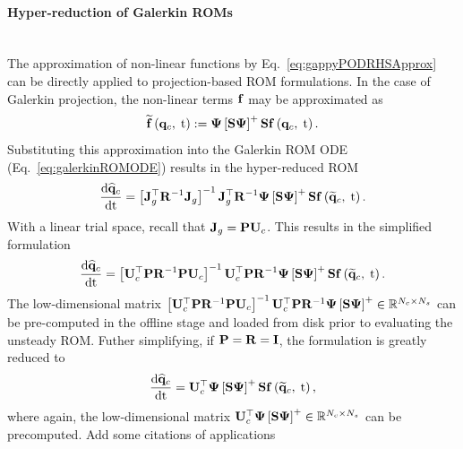 \paragraph*{Hyper-reduction of Galerkin ROMs}\mbox{}\\
%
The approximation of non-linear functions by Eq.~\ref{eq:gappyPODRHSApprox} can be directly applied to projection-based ROM formulations. In the case of Galerkin projection, the non-linear terms $\mathbf{f}$ may be approximated as
%
\begin{equation}
	\rhsApproxFunc{\consVec, \; \timeVar} \defEq \deimBasis \left[ \sampMat \deimBasis \right]^+ \sampMat \rhsFunc{\consVec, \; \timeVar}.
\end{equation}
%
Substituting this approximation into the Galerkin ROM ODE (Eq.~\ref{eq:galerkinROMODE}) results in the hyper-reduced ROM
%
\begin{equation}\label{eq:galerkinROMHR}
    \ode{\consVecCoef}{\timeVar} = \left[\jacobDecode^\top \resScaleInv \jacobDecode\right]^{-1} \jacobDecode^\top \resScaleInv \deimBasis \left[ \sampMat \deimBasis \right]^+ \sampMat \rhsFunc{\consVecRom, \; \timeVar}.
\end{equation}
%
With a linear trial space, recall that $\jacobDecode = \consScale \consTrial$. This results in the simplified formulation
%
\begin{equation}
    \ode{\consVecCoef}{\timeVar} = \left[\consTrial^\top \consScale \resScaleInv \consScale \consTrial\right]^{-1} \consTrial^\top \consScale \resScaleInv \deimBasis \left[ \sampMat \deimBasis \right]^+ \sampMat \rhsFunc{\consVecRom, \; \timeVar}.
\end{equation}
%
The low-dimensional matrix $\left[\consTrial^\top \consScale \resScaleInv \consScale \consTrial\right]^{-1} \consTrial^\top \consScale \resScaleInv \deimBasis \left[ \sampMat \deimBasis \right]^+ \inRTwo{\numConsModes}{\numSamps}$ can be pre-computed in the offline stage and loaded from disk prior to evaluating the unsteady ROM. Futher simplifying, if $\consScale = \resScale = \identMat$, the formulation is greatly reduced to
%
\begin{equation}
    \ode{\consVecCoef}{\timeVar} = \consTrial^\top \deimBasis \left[ \sampMat \deimBasis \right]^+ \sampMat \rhsFunc{\consVecRom, \; \timeVar},
\end{equation}
%
where again, the low-dimensional matrix $\consTrial^\top \deimBasis \left[ \sampMat \deimBasis \right]^+ \inRTwo{\numConsModes}{\numSamps}$ can be precomputed. {\color{red}Add some citations of applications}

